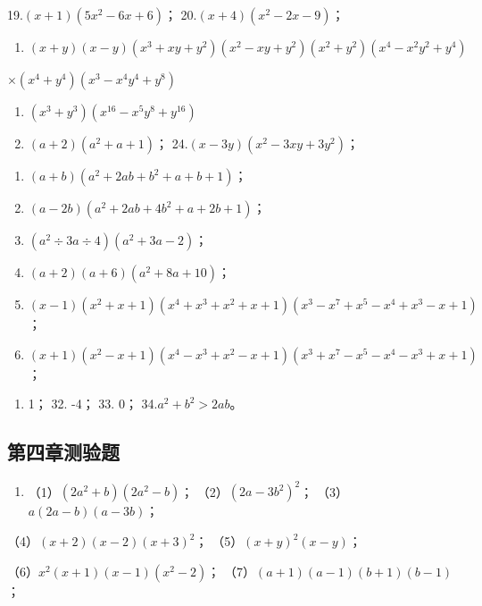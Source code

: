 19.\((x + 1)(5x^{2} - 6x + 6)\)； 20.\((x + 4)(x^{2} - 2x - 9)\)；

\begin{enumerate}[start=21]
\item
  \((x + y)(x - y)(x^3 +xy + y^2)(x^2 -xy + y^2)(x^2 +y^2)(x^4 -x^2y^2 +y^4)\)
\end{enumerate}

\(\times (x^{4} + y^{4})(x^{3} - x^{4}y^{4} + y^{8})\)
\begin{enumerate}[start=22]
\item
  \((x^{3} + y^{3})(x^{16} - x^{5}y^{8} + y^{16})\)
\item
  \((a + 2)(a^2 + a + 1)\)； 24.\((x - 3y)(x^2 - 3xy + 3y^2)\)；
\end{enumerate}

\begin{enumerate}[start=25]
\item
  \((a + b)(a^2 + 2ab + b^2 + a + b + 1)\)；
\item
  \((a - 2b)(a^2 + 2ab + 4b^2 + a + 2b + 1)\)；
\item
  \((a^2 \div 3a \div 4)(a^2 + 3a - 2)\)；
\item
  \((a + 2)(a + 6)(a^2 + 8a + 10)\)；
\item
  \((x - 1)(x^2 + x + 1)(x^4 + x^3 + x^2 + x + 1)(x^3 - x^7 + x^5 - x^4 + x^3 - x + 1)\)；
\item
  \((x + 1)(x^2 - x + 1)(x^4 - x^3 + x^2 - x + 1)(x^3 + x^7 - x^5 - x^4 - x^3 + x + 1)\)；
\end{enumerate}

\begin{enumerate}[start=31]
\item
  1； 32. -4； 33. 0； 34.\(a^2 + b^2 > 2ab\)。
\end{enumerate}

\subsection{第四章测验题}

\begin{enumerate}
\item
  （1）\((2a^{2} + b)(2a^{2} - b)\)； （2）\((2a - 3b^{2})^{2}\)；
  （3）\(a(2a - b)(a - 3b)\)；
\end{enumerate}

（4）\((x + 2)(x - 2)(x + 3)^{2}\)； （5）\((x + y)^{2}(x - y)\)；

（6）\(x^{2}(x + 1)(x - 1)(x^{2} - 2)\)；
（7）\((a + 1)(a - 1)(b + 1)(b - 1)\)；

